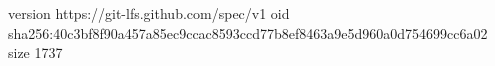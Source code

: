 version https://git-lfs.github.com/spec/v1
oid sha256:40c3bf8f90a457a85ec9ccac8593ccd77b8ef8463a9e5d960a0d754699cc6a02
size 1737
